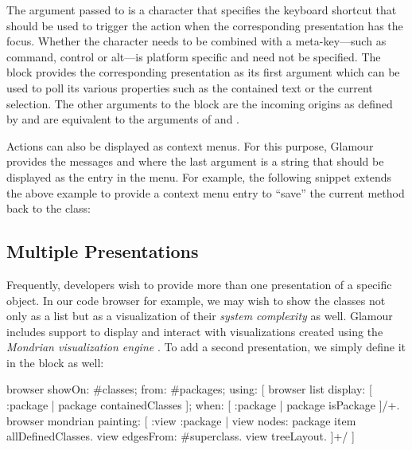 \documentclass[a4paper,10pt,twoside]{book}
\begin{document}
The argument passed to  is a character that specifies the keyboard shortcut that should be used to trigger the action when the corresponding presentation has the focus. Whether the character needs to be combined with a meta-key---such as command, control or alt---is platform specific and need not be specified. The  block provides the corresponding presentation as its first argument which can be used to poll its various properties such as the contained text or the current selection. The other arguments to the block are the incoming origins as defined by  and are equivalent to the arguments of  and .

Actions can also be displayed as context menus. For this purpose, Glamour provides the messages  and  where the last argument is a string that should be displayed as the entry in the menu. For example, the following snippet extends the above example to provide a context menu entry to ``save'' the current method back to the class:


\subsection{Multiple Presentations}

Frequently, developers wish to provide more than one presentation of a specific object. In our code browser for example, we may wish to show the classes not only as a list but as a visualization of their \emph{system complexity} as well. Glamour includes support to display and interact with visualizations created using the \emph{Mondrian visualization engine} \cite{Meye06b}. To add a second presentation, we simply define it in the  block as well:

\begin{code}{}
browser showOn: #classes; from: #packages; using: [
	browser list 
		display: [ :package | package containedClasses ];
		when: [ :package | package isPackage ]/+.
	browser mondrian painting: [ :view :package |
		view nodes: package item allDefinedClasses.
		view edgesFrom: #superclass.
		view treeLayout.
	]+/
]
\end{code}
\end{document}
